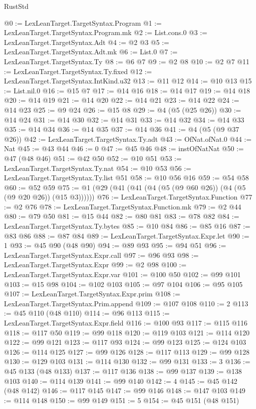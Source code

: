 \begin{lexlean}{RustStd}
\begin{coremodule}
@0 := LexLeanTarget.TargetSyntax.Program
@1 := LexLeanTarget.TargetSyntax.Program.mk
@2 := List.cons.{0}
@3 := LexLeanTarget.TargetSyntax.Adt
@4 := @2 @3
@5 := LexLeanTarget.TargetSyntax.Adt.mk
@6 := List.{0}
@7 := LexLeanTarget.TargetSyntax.Ty
@8 := @6 @7
@9 := @2 @8
@10 := @2 @7
@11 := LexLeanTarget.TargetSyntax.Ty.fixed
@12 := LexLeanTarget.TargetSyntax.IntKind.u32
@13 := @11 @12
@14 := @10 @13
@15 := List.nil.{0}
@16 := @15 @7
@17 := @14 @16
@18 := @14 @17
@19 := @14 @18
@20 := @14 @19
@21 := @14 @20
@22 := @14 @21
@23 := @14 @22
@24 := @14 @23
@25 := @9 @24
@26 := @15 @8
@29 := @4 (@5 (@25 @26))
@30 := @14 @24
@31 := @14 @30
@32 := @14 @31
@33 := @14 @32
@34 := @14 @33
@35 := @14 @34
@36 := @14 @35
@37 := @14 @36
@41 := @4 (@5 (@9 @37 @26))
@42 := LexLeanTarget.TargetSyntax.Ty.adt
@43 := OfNat.ofNat.{0}
@44 := Nat
@45 := @43 @44
@46 := 0
@47 := @45 @46
@48 := instOfNatNat
@50 := @47 (@48 @46)
@51 := @42 @50
@52 := @10 @51
@53 := LexLeanTarget.TargetSyntax.Ty.nat
@54 := @10 @53
@56 := LexLeanTarget.TargetSyntax.Ty.list @51
@58 := @10 @56 @16
@59 := @54 @58
@60 := @52 @59
@75 := @1 (@29 (@41 (@41 (@4 (@5 (@9 @60 @26)) (@4 (@5 (@9 @20 @26)) (@15 @3))))))
@76 := LexLeanTarget.TargetSyntax.Function
@77 := @2 @76
@78 := LexLeanTarget.TargetSyntax.Function.mk
@79 := @2 @44
@80 := @79 @50
@81 := @15 @44
@82 := @80 @81
@83 := @78 @82
@84 := LexLeanTarget.TargetSyntax.Ty.bytes
@85 := @10 @84
@86 := @85 @16
@87 := @83 @86
@88 := @87 @84
@89 := LexLeanTarget.TargetSyntax.Expr.let
@90 := 1
@93 := @45 @90 (@48 @90)
@94 := @89 @93
@95 := @94 @51
@96 := LexLeanTarget.TargetSyntax.Expr.call
@97 := @96 @93
@98 := LexLeanTarget.TargetSyntax.Expr
@99 := @2 @98
@100 := LexLeanTarget.TargetSyntax.Expr.var
@101 := @100 @50
@102 := @99 @101
@103 := @15 @98
@104 := @102 @103
@105 := @97 @104
@106 := @95 @105
@107 := LexLeanTarget.TargetSyntax.Expr.prim
@108 := LexLeanTarget.TargetSyntax.Prim.append
@109 := @107 @108
@110 := 2
@113 := @45 @110 (@48 @110)
@114 := @96 @113
@115 := LexLeanTarget.TargetSyntax.Expr.field
@116 := @100 @93
@117 := @115 @116
@118 := @117 @50
@119 := @99 @118
@120 := @119 @103
@121 := @114 @120
@122 := @99 @121
@123 := @117 @93
@124 := @99 @123
@125 := @124 @103
@126 := @114 @125
@127 := @99 @126
@128 := @117 @113
@129 := @99 @128
@130 := @129 @103
@131 := @114 @130
@132 := @99 @131
@133 := 3
@136 := @45 @133 (@48 @133)
@137 := @117 @136
@138 := @99 @137
@139 := @138 @103
@140 := @114 @139
@141 := @99 @140
@142 := 4
@145 := @45 @142 (@48 @142)
@146 := @117 @145
@147 := @99 @146
@148 := @147 @103
@149 := @114 @148
@150 := @99 @149
@151 := 5
@154 := @45 @151 (@48 @151)

\end{coremodule}
\end{lexlean}
